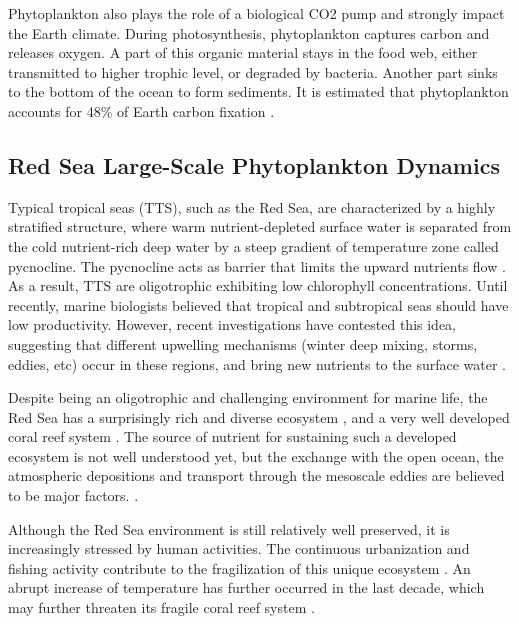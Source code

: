 Phytoplankton also plays the role of a biological CO2 pump and strongly impact
the Earth climate. During photosynthesis, phytoplankton captures carbon and
releases oxygen. A part of this organic material stays in the food web, either
transmitted to higher trophic level, or degraded  by bacteria. Another part
sinks to the bottom of the ocean to form sediments. It is estimated that
phytoplankton accounts for 48\% of Earth carbon fixation \citep{Pal2014}.

\subsection{Red Sea Large-Scale Phytoplankton Dynamics}

Typical tropical seas (TTS), such as the Red Sea, are characterized by a highly
stratified structure, where warm nutrient-depleted surface water is separated
from the cold nutrient-rich deep water by a steep gradient of temperature zone
called pycnocline. The pycnocline acts as barrier that limits the upward
nutrients flow \citep{Mann2006}. As a result, TTS are oligotrophic exhibiting
low chlorophyll concentrations. Until recently, marine biologists believed that
tropical and subtropical seas should have low productivity. However, recent
investigations have contested this idea, suggesting that different upwelling
mechanisms (winter deep mixing, storms, eddies, etc) occur in these regions,
and bring new nutrients to the surface water \citep{Mann2006}.

Despite being an oligotrophic and challenging environment for marine life, the
Red Sea has a surprisingly rich and diverse ecosystem \citep{Raitsos2011},
and a very well developed coral reef system \citep{Racault}. The source of
nutrient for sustaining such a developed ecosystem is not well understood yet,
but the exchange with the open ocean, the atmospheric depositions and transport
through the mesoscale eddies are believed to be major factors.
\citep{Raitsos2013, Zhan2014}.

Although the Red Sea environment is still relatively well preserved, it is
increasingly stressed by human activities. The continuous urbanization and
fishing activity contribute to the fragilization of this unique ecosystem
\citep{Acker2008}. An abrupt increase of temperature has further occurred in
the last decade, which may further threaten its fragile coral reef system
\citep{Raitsos2011}.

